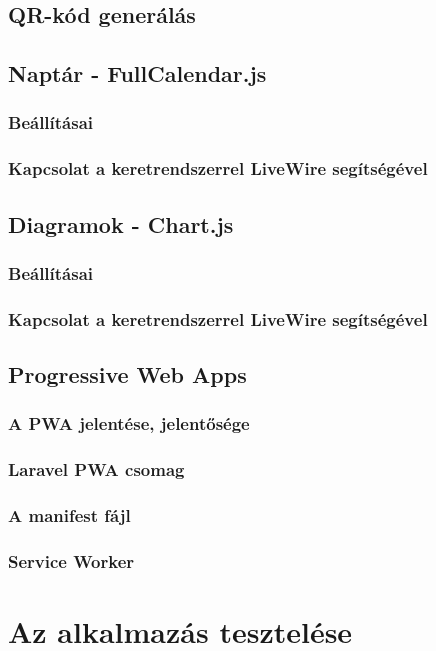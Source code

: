 \documentclass[
]{thesis-ekf}
\theoremstyle{definition}
\theoremstyle{remark}
\begin{document}
\section{QR-kód generálás}

\section{Naptár - FullCalendar.js}
\subsection{Beállításai}
\subsection{Kapcsolat a keretrendszerrel LiveWire segítségével}

\section{Diagramok - Chart.js}
\subsection{Beállításai}
\subsection{Kapcsolat a keretrendszerrel LiveWire segítségével}

\section{Progressive Web Apps}
\subsection{A PWA jelentése, jelentősége}
\subsection{Laravel PWA csomag}
\subsection{A manifest fájl}
\subsection{Service Worker}

\chapter{Az alkalmazás tesztelése}
\end{document}
